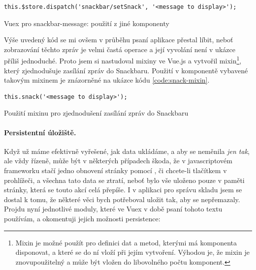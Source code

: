 \begin{listing}[h]
\begin{verbatim}
this.$store.dispatch('snackbar/setSnack', '<message to display>');
\end{verbatim}
\caption{Vuex pro snackbar-message: použití z jiné komponenty} \label{code:vuex-snack-use}
\end{listing}

Výše uvedený kód se mi ovšem v průběhu psaní aplikace přestal líbit, neboť zobrazování těchto zpráv je velmi častá operace a její vyvolání není v ukázce příliš jednoduché. Proto jsem si nastudoval mixiny ve Vue.js \cite{vue-mixin} a vytvořil mixin\footnote{Mixin je možné použít pro definici dat a metod, kterými má komponenta disponovat, a které se do ní vloží při jejím vytvoření. Výhodou je, že mixin je znovupoužitelný a může být vložen do libovolného počtu komponent.}, který zjednodušuje zasílání zpráv do Snackbaru. Použití v komponentě vybavené takovým mixinem je znázorněné na ukázce kódu \ref{code:snack-mixin}.

\begin{listing}[h]
\begin{verbatim}
this.snack('<message to display>');
\end{verbatim}
\caption{Použití mixinu pro zjednodušení zasílání zpráv do Snackbaru} \label{code:snack-mixin}
\end{listing}

\paragraph{Persistentní úložiště.} Když už máme efektivně vyřešené, jak data ukládáme, a aby se neměnila \emph{jen tak}, ale vždy řízeně, může být v některých případech škoda, že v javascriptovém frameworku stačí jedno obnovení stránky pomocí ,  či chcete-li tlačítkem v prohlížeči, a všechna tato data se ztratí, neboť bylo vše uloženo pouze v paměti stránky, která se touto akcí celá přepíše. I v aplikaci pro správu skladu jsem se dostal k tomu, že některé věci bych potřeboval uložit tak, aby se nepřemazaly. Projdu nyní jednotlivé moduly, které ve Vuex v době psaní tohoto textu používám, a okomentuji jejich možnosti persistence:

